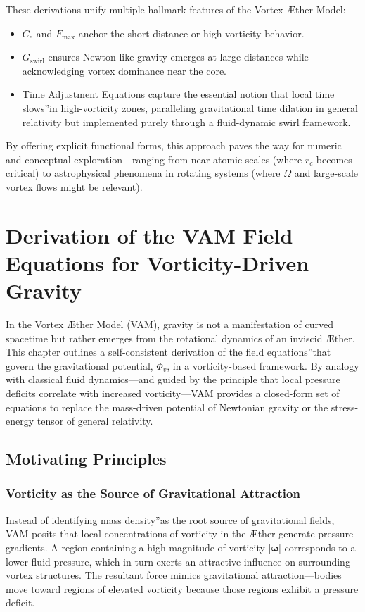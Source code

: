 \documentclass[a4paper,12pt]{article}
\begin{document}
These derivations unify multiple hallmark features of the Vortex Æther Model:
\begin{itemize}
    \item \(C_e\) and \(F_{\max}\) anchor the short-distance or high-vorticity behavior.
    \item \(G_\text{swirl}\) ensures Newton-like gravity emerges at large distances while acknowledging vortex dominance near the core.
    \item Time Adjustment Equations capture the essential notion that \grqq local time slows\textquotedblright in high-vorticity zones, paralleling gravitational time dilation in general relativity but implemented purely through a fluid-dynamic swirl framework.
\end{itemize}

By offering explicit functional forms, this approach paves the way for numeric and conceptual exploration—ranging from near-atomic scales (where \(r_c\) becomes critical) to astrophysical phenomena in rotating systems (where \(\Omega\) and large-scale vortex flows might be relevant).

    \section{Derivation of the VAM Field Equations for Vorticity-Driven Gravity}
In the Vortex Æther Model (VAM), gravity is not a manifestation of curved spacetime but rather emerges from the rotational dynamics of an inviscid Æther. This chapter outlines a self-consistent derivation of the \grqq field equations\textquotedblright that govern the gravitational potential, \(\Phi_v\), in a vorticity-based framework. By analogy with classical fluid dynamics—and guided by the principle that local pressure deficits correlate with increased vorticity—VAM provides a closed-form set of equations to replace the mass-driven potential of Newtonian gravity or the stress-energy tensor of general relativity.

\subsection{Motivating Principles}
\subsubsection{Vorticity as the Source of Gravitational Attraction}
Instead of identifying \grqq mass density\textquotedblright as the root source of gravitational fields, VAM posits that local concentrations of vorticity in the Æther generate pressure gradients. A region containing a high magnitude of vorticity \(\lvert \boldsymbol{\omega} \rvert\) corresponds to a lower fluid pressure, which in turn exerts an attractive influence on surrounding vortex structures. The resultant force mimics gravitational attraction—bodies move toward regions of elevated vorticity because those regions exhibit a pressure deficit.
\end{document}
